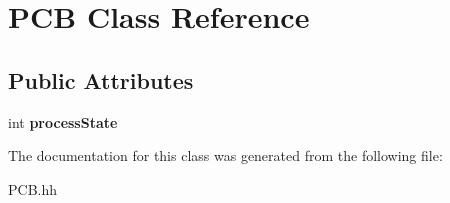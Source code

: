 \hypertarget{class_p_c_b}{}\section{P\+CB Class Reference}
\label{class_p_c_b}
\subsection*{Public Attributes}
\begin{DoxyCompactItemize}
\item 
int {\bfseries process\+State}\hypertarget{class_p_c_b_a3d6554a0202915c712dc3a7f46da9fcb}{}\label{class_p_c_b_a3d6554a0202915c712dc3a7f46da9fcb}

\end{DoxyCompactItemize}


The documentation for this class was generated from the following file\+:\begin{DoxyCompactItemize}
\item 
P\+C\+B.\+hh\end{DoxyCompactItemize}
